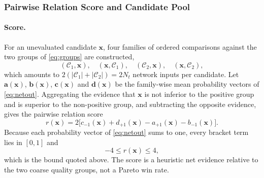 \documentclass[11pt,a4paper]{article}
\newcommand{\vx}{\mathbf{x}}
\begin{document}
\subsubsection{Pairwise Relation Score and Candidate Pool}
\label{sec:method:candidate:score}

\paragraph{Score.}
For an unevaluated candidate $\vx$, four families of ordered comparisons against
the two groups of \eqref{eq:groups} are constructed,
\begin{equation}
(\mathcal{C}_1,\vx),\quad
(\vx,\mathcal{C}_1),\quad
(\mathcal{C}_2,\vx),\quad
(\vx,\mathcal{C}_2),
\label{eq:fourfamilies}
\end{equation}
which amounts to $2(|\mathcal{C}_1|+|\mathcal{C}_2|)=2N_t$ network inputs per
candidate. Let $\mathbf{a}(\vx)$, $\mathbf{b}(\vx)$, $\mathbf{c}(\vx)$ and
$\mathbf{d}(\vx)$ be the family-wise mean probability vectors of
\eqref{eq:netout}. Aggregating the evidence that $\vx$ is not inferior to the
positive group and is superior to the non-positive group, and subtracting the
opposite evidence, gives the pairwise relation score
\begin{equation}
r(\vx)=2\bigl[
c_{-1}(\vx)+d_{+1}(\vx)-a_{+1}(\vx)-b_{-1}(\vx)
\bigr].
\label{eq:relscore}
\end{equation}
Because each probability vector of \eqref{eq:netout} sums to one, every bracket
term lies in $[0,1]$ and
\begin{equation}
-4\leq r(\vx)\leq 4 ,
\label{eq:relbound}
\end{equation}
which is the bound quoted above. The score is a heuristic net evidence relative
to the two coarse quality groups, not a Pareto win rate.
\end{document}
